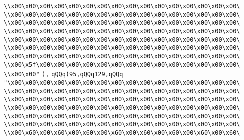 \verb|\\x00\x00\x00\x00\x00\x00\x00\x00\x00\x00\x00\x00\x00\x00\x00\x00\|\newline
\verb|\\x00\x00\x00\x00\x00\x00\x00\x00\x00\x00\x00\x00\x00\x00\x00\x00\|\newline
\verb|\\x00\x00\x00\x00\x00\x00\x00\x00\x00\x00\x00\x00\x00\x00\x00\x00\|\newline
\verb|\\x00\x00\x00\x00\x00\x00\x00\x00\x00\x00\x00\x00\x00\x00\x00\x00\|\newline
\verb|\\x00\x00\x00\x00\x00\x00\x00\x00\x00\x00\x00\x00\x00\x00\x00\x00\|\newline
\verb|\\x00\x00\x00\x00\x00\x00\x00\x00\x00\x00\x00\x00\x00\x00\x00\x00\|\newline
\verb|\\x00\x00\x00\x00\x00\x00\x00\x00\x00\x00\x00\x00\x00\x00\x00\x00\|\newline
\verb|\\x00\x5f\x00\x00\x00\x00\x00\x00\x00\x00\x00\x00\x00\x00\x00\x00\|\newline
\verb|\\x00\x00"|\newline
\verb|),|\newline
\verb|qQQq(95,qQQq129,qQQq|\newline
\verb|"\x00\x00\x00\x00\x00\x00\x00\x00\x00\x00\x00\x00\x00\x00\x00\x00\|\newline
\verb|\\x00\x00\x00\x00\x00\x00\x00\x00\x00\x00\x00\x00\x00\x00\x00\x00\|\newline
\verb|\\x00\x00\x00\x00\x00\x00\x00\x00\x00\x00\x00\x00\x00\x00\x00\x00\|\newline
\verb|\\x00\x00\x00\x00\x00\x00\x00\x00\x00\x00\x00\x00\x00\x00\x00\x00\|\newline
\verb|\\x00\x00\x00\x00\x00\x00\x00\x00\x00\x00\x00\x00\x00\x00\x00\x00\|\newline
\verb|\\x00\x00\x00\x00\x00\x00\x00\x00\x00\x00\x00\x00\x00\x00\x00\x00\|\newline
\verb|\\x00\x60\x00\x60\x00\x60\x00\x60\x00\x60\x00\x60\x00\x60\x00\x60\|\newline
